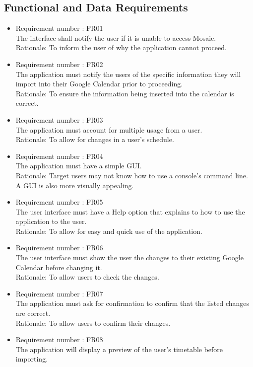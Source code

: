\documentclass[12pt, titlepage]{article}
\begin{document}
\subsection{Functional and Data Requirements}
\begin{itemize}
\item Requirement number : FR01\\
The interface shall notify the user if it is unable to access Mosaic.\\
Rationale: To inform the user of why the application cannot proceed.
\item Requirement number : FR02\\
The application must notify the users of the specific information they will import into their Google Calendar prior to proceeding.\\
Rationale: To ensure the information being inserted into the calendar is correct.
\item Requirement number : FR03\\
The application must account for multiple usage from a user. \\
Rationale: To allow for changes in a user’s schedule.
\item Requirement number : FR04\\
The application must have a simple GUI. \\
Rationale: Target users may not know how to use a console’s command line. A GUI is also more visually appealing.
\item Requirement number : FR05\\
The user interface must have a Help option that explains to how to use the application to the user.\\
Rationale: To allow for easy and quick use of the application.
\item Requirement number : FR06\\
The user interface must show the user  the changes to their existing Google Calendar before changing it. \\
Rationale: To allow users to check the changes.
\item Requirement number : FR07\\
The application must ask for confirmation to confirm that the listed changes are correct. \\
Rationale: To allow users to confirm their changes.
\item Requirement number : FR08\\
The application will display a preview of the user’s timetable before importing.\\

\end{itemize}
\end{document}
